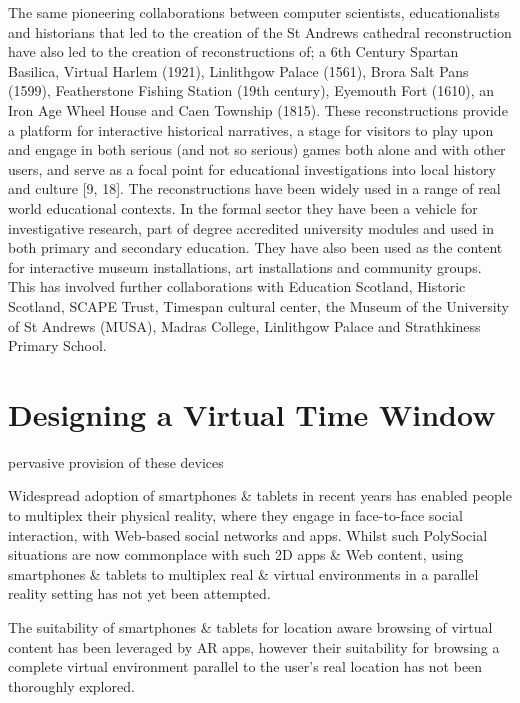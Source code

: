 The same pioneering collaborations between computer scientists, educationalists and historians that led to the creation of the St Andrews cathedral reconstruction have also led to the creation of reconstructions of; a 6th Century Spartan Basilica, Virtual Harlem (1921), Linlithgow Palace (1561), Brora Salt Pans (1599), Featherstone Fishing Station (19th century), Eyemouth Fort (1610), an Iron Age Wheel House and Caen Township (1815). These reconstructions provide a platform for interactive historical narratives, a stage for visitors to play upon and engage in both serious (and not so serious) games both alone and with other users, and serve as a focal point for educational investigations into local history and culture [9, 18]. The reconstructions have been widely used in a range of real world educational contexts. In the formal sector they have been a vehicle for investigative research, part of degree accredited university modules and used in both primary and secondary education. They have also been used as the content for interactive museum installations, art installations and community groups. This has involved further collaborations with Education Scotland, Historic Scotland, SCAPE Trust, Timespan cultural center, the Museum of the University of St Andrews (MUSA), Madras College, Linlithgow Palace and Strathkiness Primary School.



\section{Designing a Virtual Time Window}

pervasive provision of these devices 

Widespread adoption of smartphones \& tablets in recent years has enabled people to multiplex their physical reality, where they engage in face-to-face social interaction, with Web-based social networks and apps\cite{Accenture2012}. Whilst such PolySocial situations are now commonplace with such 2D apps \& Web content, using smartphones \& tablets to multiplex real \& virtual environments in a parallel reality setting has not yet been attempted.

The suitability of smartphones \& tablets for location aware browsing of virtual content has been leveraged by AR apps, however their suitability for browsing a complete virtual environment parallel to the user's real location has not been thoroughly explored.

